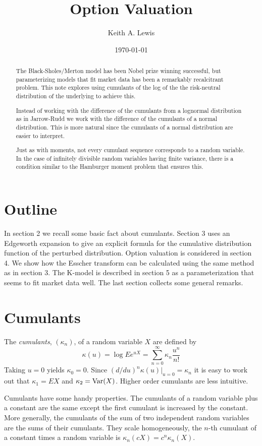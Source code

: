 \documentclass[11pt]{article}
\title{Option Valuation}
\author{Keith A. Lewis}
\date{\today}
\newcommand{\Var}{\mathop{\rm{Var}}}
\theoremstyle{remark}
\begin{document}
\maketitle
\begin{abstract}
The Black-Sholes/Merton model has been Nobel prize winning successful,
but parameterizing models that fit market data has been a remarkably
recalcitrant problem. This note explores using cumulants of the
log of the the risk-neutral distribution of the underlying to
achieve this.

Instead of working with the difference of the cumulants from a lognormal
distribution as in Jarrow-Rudd \cite{?} we work with the difference of
the cumulants of a normal distribution. 
This is more natural since the cumulants of a normal distribution are
easier to interpret.

Just as with moments, not every cumulant sequence corresponds to a
random variable. In the case of infinitely divisible random variables
having finite variance, there is a condition similar to the Hamburger
moment problem that ensures this.
\end{abstract}

\section{Outline}
In section 2 we recall some basic fact about cumulants.
Section 3 uses an Edgeworth expansion to give an explicit formula for
the cumulative distribution function of the perturbed distribution.
Option valuation is considered in section 4. We show how the
Esscher transform can be calculated using the same method as in
section 3. The K-model is described in section 5 as a parameterization
that seems to fit market data well. The last section collects some
general remarks.

\section{Cumulants}

The {\em cumulants}, \((\kappa_n)\), of a random variable \(X\)
are defined by
\[
\kappa(u) = \log Ee^{uX} = \sum_{n=0}^\infty \kappa_n \frac{u^n}{n!}
\]
Taking \(u = 0\) yields \(\kappa_0 = 0\). Since
\((d/du)^n\kappa(u)|_{u = 0} = \kappa_n\) it is easy to
work out that
\(\kappa_1 = EX\) and \(\kappa_2 = \Var(X)\). Higher order
cumulants are less intuitive.

Cumulants have some handy properties. 
The cumulants of a random variable plus a constant are the 
same except the first cumulant is increased by the constant.
More generally, the cumulants of the sum of two independent 
random variables are the sums of their cumulants.
They scale homogeneously, the \(n\)-th cumulant of a constant
times a random variable is
\(\kappa_n(cX) = c^n\kappa_n(X)\).
\end{document}
